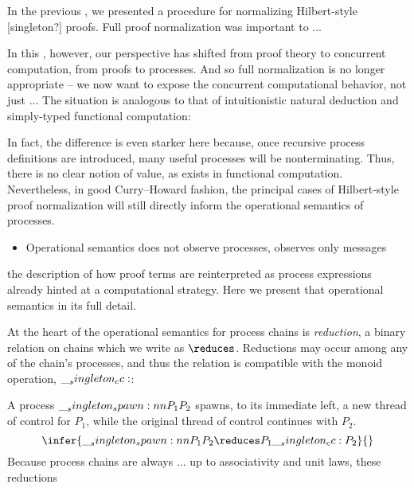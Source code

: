 In the previous , we presented a procedure for normalizing Hilbert-style [singleton?] proofs.
Full proof normalization was important to ...

In this , however, our perspective has shifted from proof theory to concurrent computation, from proofs to processes.
And so full normalization is no longer appropriate -- we now want to expose the concurrent computational behavior, not just ...
The situation is analogous to that of intuitionistic natural deduction and simply-typed functional computation:

In fact, the difference is even starker here because, once recursive process definitions are introduced, many useful processes will be nonterminating.
Thus, there is no clear notion of value, as exists in functional computation.
Nevertheless, in good Curry--Howard fashion, the principal cases of Hilbert-style proof normalization will still directly inform the operational semantics of processes.

\begin{itemize}
\item Operational semantics does not observe processes, observes only messages
\end{itemize}

 the description of how proof terms are reinterpreted as process expressions already hinted at a computational strategy.
Here we present that operational semantics in its full detail.


At the heart of the operational semantics for process chains is \emph{reduction}, a binary relation on chains which we write as $\reduces$.
Reductions may occur among any of the chain's processes, and thus the relation is compatible with the monoid operation, $\__singleton_cc:$:

A process $\__singleton_spawn:nn {P_1} {P_2}$ spawns, to its immediate left, a new thread of control for $P_1$, while the original thread of control continues with $P_2$.
\begin{equation*}
  \infer{\spawn{P_1}{P_2} \reduces P_1 \cc P_2}{}
\end{equation*}
Because process chains are always ... up to associativity and unit laws, these reductions 

